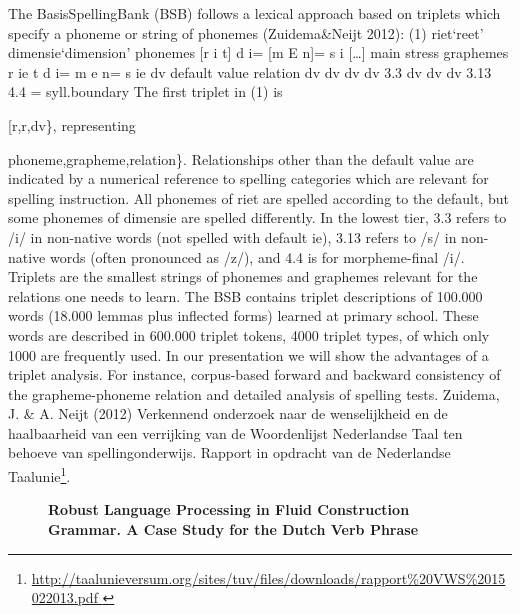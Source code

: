 \documentclass[10pt, a4paper, twopage, headinclude, footinclude, BCOR5mm]{scrartcl}
\begin{document}
\noindent
The BasisSpellingBank (BSB) follows a lexical approach based on triplets which specify a phoneme or string of phonemes (Zuidema\&Neijt 2012): (1)		riet‘reet’		dimensie‘dimension’	 	phonemes	[r	i	t]		d	i=	[m	E	n]=	s	i	[…]	 main stress 	graphemes	r	ie	t		d	i=	m	e	n=	s	ie	dv	default value 	relation	dv	dv	dv		dv	3.3	dv	dv	dv	3.13	4.4	=	syll.boundary The first triplet in (1) is {[r,r,dv\}, representing {phoneme,grapheme,relation\}. Relationships other than the default value are indicated by a numerical reference to spelling categories which are relevant for spelling instruction. All phonemes of riet are spelled according to the default, but some phonemes of dimensie are spelled differently. In the lowest tier, 3.3 refers to /i/ in non-native words (not spelled with default ie), 3.13 refers to /s/ in non-native words (often pronounced as /z/), and 4.4 is for morpheme-final /i/. Triplets are the smallest strings of phonemes and graphemes relevant for the relations one needs to learn. 	The BSB contains triplet descriptions of 100.000 words (18.000 lemmas plus inflected forms) learned at primary school. These words are described in 600.000 triplet tokens, 4000 triplet types, of which only 1000 are frequently used. In our presentation we will show the advantages of a triplet analysis. For instance, corpus-based forward and backward consistency of the grapheme-phoneme relation and detailed analysis of spelling tests.  Zuidema, J. \& A. Neijt (2012) Verkennend onderzoek naar de wenselijkheid en de haalbaarheid van een verrijking van de Woordenlijst Nederlandse Taal ten behoeve van spellingonderwijs. Rapport in opdracht van de Nederlandse Taalunie\footnote{\url{ http://taalunieversum.org/sites/tuv/files/downloads/rapport\%20VWS\%2015022013.pdf }}.


\newpage

\begin{figure}[t!]
\centering
\large\textbf{Robust Language Processing in Fluid Construction Grammar. A Case Study for the Dutch Verb Phrase}
\vspace*{0.5cm}
\end{figure}


        \begin{table}[t!]
\end{table}}}
\end{document}
